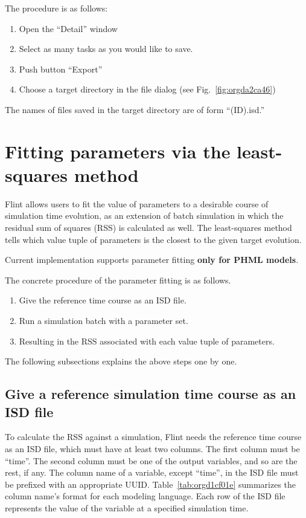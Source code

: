 \documentclass[a4paper,10pt]{report}
\begin{document}
The procedure is as follows:

\begin{enumerate}
\item Open the ``Detail'' window
\item Select as many tasks as you would like to save.
\item Push button ``Export''
\item Choose a target directory in the file dialog (see Fig.~\ref{fig:orgda2ca46})
\end{enumerate}

The names of files saved in the target directory are of form ``(ID).isd.''

\section{Fitting parameters via the least-squares method}
\label{sec:org113b8ee}
Flint allows users to fit the value of parameters to a desirable course of
simulation time evolution, as an extension of batch simulation in which
the residual sum of squares (RSS) is calculated as well. The least-squares
method tells which value tuple of parameters is the closest to the given
target evolution.

Current implementation supports parameter fitting \textbf{only for PHML models}.

The concrete procedure of the parameter fitting is as follows.

\begin{enumerate}
\item Give the reference time course as an ISD file.
\item Run a simulation batch with a parameter set.
\item Resulting in the RSS associated with each value tuple of parameters.
\end{enumerate}

The following subsections explains the above steps one by one.

\subsection{Give a reference simulation time course  as an ISD file}
\label{sec:orgc2f02d4}
To calculate the RSS against a simulation, Flint needs the reference time course
as an ISD file, which must have at least two columns.
The first column must be ``time''. The second column must be one of the output
variables, and so are the rest, if any.
The column name of a variable, except ``time'', in the ISD file must be prefixed
with an appropriate UUID.
Table~\ref{tab:orgd1cf01e} summarizes the column name's format for each
modeling language.
Each row of the ISD file represents the value of the variable at a specified
simulation time.
\end{document}
